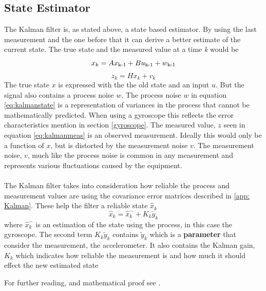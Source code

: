 \documentclass[a4paper,11pt]{kth-mag}
\begin{document}
\subsection{State Estimator}
The Kalman filter is, as stated above, a state based estimator. By using the last measurement and the one before that it can derive a better estimate of the current state. The true state and the measured value at a time \textit{k} would be
\begin{equation}\label{eq:kalmanstate}
x_k = Ax\textsubscript{k-1}+Bu\textsubscript{k-1}+w\textsubscript{k-1}
\end{equation}
\begin{equation} \label{eq:kalmanmeas}
z_k = Hx_k + v_k
\end{equation}
The true state $x$ is expressed with the the old state and an input $u$. But the signal also contains a process noise $w$. The process noise $w$ in equation \eqref{eq:kalmanstate} is a representation of variances in the process that cannot be mathematically predicted. When using a gyroscope this reflects the error characteristics mention in section \ref{gyroscope}. 
The measured value, $z$ seen in equation \eqref{eq:kalmanmeas} is an observed measurement. Ideally this would only be a function of $x$, but is distorted by the measurement noise $v$.
The measurement noise, $v$, much like the process noise is common in any measurement and represents various fluctuations caused by the equipment.
\\ \\
The Kalman filter takes into consideration how reliable the  process and measurement values are using the covariance error matrices described in \ref{app: Kalman}. These help the filter a reliable state $\hat{x}_k$
\begin{equation}
\hat{x}_k = \hat{x}^-_k + K_k\tilde{y}_k
\end{equation}
where $\hat{x}^-_k$ is an estimation of the state using the process, in this case the gyroscope. The second term $K_k\tilde{y}_k$ contains $\tilde{y}_k$ which is a \textbf{parameter} that consider the measurement, the accelerometer. It also contains the Kalman gain, $K_k$ which indicates how reliable the measurement is and how much it should effect the new estimated state

For further reading, and mathematical proof see \cite{Kalmanintro}.
\end{document}
